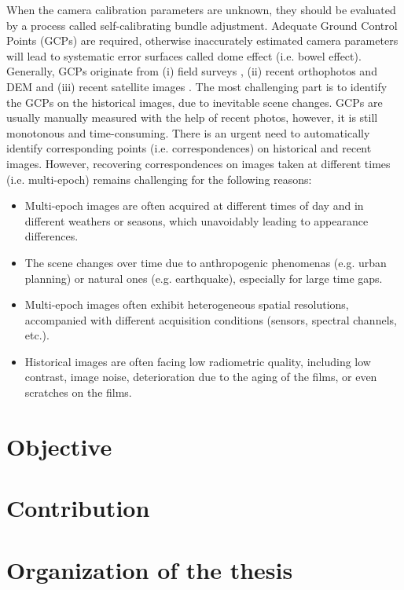 \par
When the camera calibration parameters are unknown, they should be evaluated by a process called self-calibrating bundle adjustment. Adequate Ground Control Points (GCPs) are required, otherwise inaccurately estimated camera parameters will lead to systematic error surfaces called dome effect (i.e. bowel effect).
Generally, GCPs originate from (i) field surveys \cite{micheletti2015application,walstra2004time,cardenal2006use}, (ii) recent orthophotos and DEM \cite{nurminen2015automation,ellis2006measuring,fox2008unlocking} and (iii) recent satellite images \cite{ellis2006measuring,ford2013shoreline}. The most challenging part is to identify the GCPs on the historical images, due to inevitable scene changes. GCPs are usually manually measured with the help of recent photos, however, it is still monotonous and time-consuming. 
There is an urgent need to automatically identify corresponding points (i.e. correspondences) on historical and recent images. However, recovering correspondences on images taken at different times (i.e. multi-epoch) remains challenging for the following reasons:
\begin{itemize}
	\item Multi-epoch images are often acquired at different times of day and in different weathers or seasons, which unavoidably leading to appearance differences.
	\item The scene changes over time due to anthropogenic phenomenas (e.g. urban planning) or natural ones (e.g. earthquake), especially for large time gaps.
	\item Multi-epoch images often exhibit heterogeneous spatial resolutions, accompanied with different acquisition conditions (sensors, spectral channels, etc.).
	\item Historical images are often facing low radiometric quality, including low contrast, image noise, deterioration due to the aging of the films, or even scratches on the films.
\end{itemize}



\section{Objective}

\section{Contribution}

\section{Organization of the thesis}
